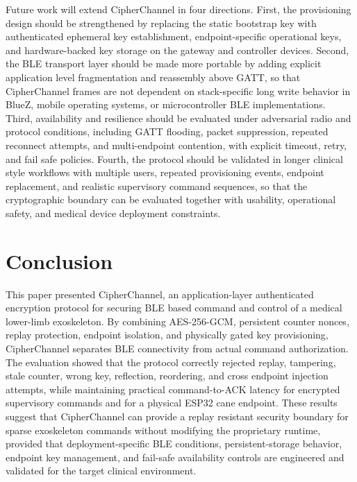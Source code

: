 \documentclass[journal]{IEEEtran}
\begin{document}
Future work will extend CipherChannel in four directions. First, the provisioning design should be strengthened by replacing the static bootstrap key with authenticated ephemeral key establishment, endpoint-specific operational keys, and hardware-backed key storage on the gateway and controller devices. Second, the BLE transport layer should be made more portable by adding explicit application level fragmentation and reassembly above GATT, so that CipherChannel frames are not dependent on stack-specific long write behavior in BlueZ, mobile operating systems, or microcontroller BLE implementations. Third, availability and resilience should be evaluated under adversarial radio and protocol conditions, including GATT flooding, packet suppression, repeated reconnect attempts, and multi-endpoint contention, with explicit timeout, retry, and fail safe policies. Fourth, the protocol should be validated in longer clinical style workflows with multiple users, repeated provisioning events, endpoint replacement, and realistic supervisory command sequences, so that the cryptographic boundary can be evaluated together with usability, operational safety, and medical device deployment constraints.



\section{Conclusion}
\label{sec:conclusion}

This paper presented CipherChannel, an application-layer authenticated encryption protocol for securing BLE based command and control of a medical lower-limb exoskeleton. By combining AES-256-GCM, persistent counter nonces, replay protection, endpoint isolation, and physically gated key provisioning, CipherChannel separates BLE connectivity from actual command authorization. The evaluation showed that the protocol correctly rejected replay, tampering, stale counter, wrong key, reflection, reordering, and cross endpoint injection attempts, while maintaining practical command-to-ACK latency for encrypted supervisory commands and for a physical ESP32 cane endpoint. These results suggest that CipherChannel can provide a replay resistant security boundary for sparse exoskeleton commands without modifying the proprietary runtime, provided that deployment-specific BLE conditions, persistent-storage behavior, endpoint key management, and fail-safe availability controls are engineered and validated for the target clinical environment.
\end{document}
